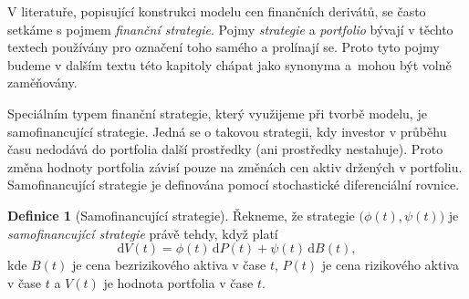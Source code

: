 \documentclass[a4paper,12pt]{report}
\theoremstyle{definition} \newtheorem{definice}[veta]{Definice}
\theoremstyle{remark}
\begin{document}


V literatuře, popisující konstrukci modelu cen finančních derivátů, se často setkáme s pojmem \textit{finanční strategie}.
Pojmy \textit{strategie} a \textit{portfolio} bývají v těchto textech používány pro označení toho samého a prolínají se.
Proto tyto pojmy budeme v dalším textu této kapitoly chápat jako synonyma a~mohou být volně zaměňovány.

Speciálním typem finanční strategie, který využijeme při tvorbě modelu, je samofinancující strategie.
Jedná se o takovou strategii, kdy investor v průběhu času nedodává do portfolia další prostředky (ani prostředky nestahuje).
Proto změna hodnoty portfolia závisí pouze na změnách cen aktiv držených v portfoliu. 
Samofinancující strategie je definována pomocí stochastické diferenciální rovnice.
\begin{definice}[Samofinancující strategie]\label{samofinancujici_strategie}
Řekneme, že strategie $\big(\phi(t),\psi(t)\big)$ je \textit{samofinancující strategie} právě tehdy, když platí
\begin{equation}\label{samofinancujici_strategie_vztah}
\mathrm{d}V(t)=\phi(t)\,\mathrm{d}P(t)+\psi(t)\,\mathrm{d}B(t),
\end{equation}
kde $B(t)$ je cena bezrizikového aktiva v čase $t$, $P(t)$ je cena rizikového aktiva v čase $t$ a $V(t)$ je hodnota portfolia v čase $t$.
\end{definice}
\end{document}

